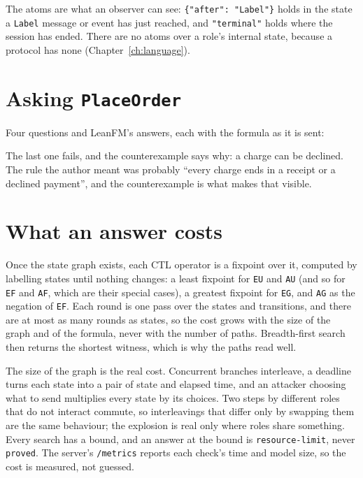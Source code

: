 The atoms are what an observer can see: \texttt{\{"after": "Label"\}} holds in
the state a \texttt{Label} message or event has just reached, and
\texttt{"terminal"} holds where the session has ended. There are no atoms over a
role's internal state, because a protocol has none (Chapter~\ref{ch:language}).

\section{Asking \texttt{PlaceOrder}}

Four questions and LeanFM's answers, each with the formula as it is sent:



The last one fails, and the counterexample says why: a charge can be declined.
The rule the author meant was probably ``every charge ends in a receipt or a
declined payment'', and the counterexample is what makes that visible.

\section{What an answer costs}

Once the state graph exists, each CTL operator is a fixpoint over it, computed by
labelling states until nothing changes: a least fixpoint for \texttt{EU} and
\texttt{AU} (and so for \texttt{EF} and \texttt{AF}, which are their special
cases), a greatest fixpoint for \texttt{EG}, and \texttt{AG} as the negation of
\texttt{EF}. Each round is one pass over the states and transitions, and there
are at most as many rounds as states, so the cost grows with the size of the
graph and of the formula, never with the number of paths. Breadth-first search
then returns the shortest witness, which is why the paths read well.

The size of the graph is the real cost. Concurrent branches interleave, a
deadline turns each state into a pair of state and elapsed time, and an attacker
choosing what to send multiplies every state by its choices. Two steps by
different roles that do not interact commute, so interleavings that differ only
by swapping them are the same behaviour; the explosion is real only where roles
share something. Every search has a bound, and an answer at the bound is
\texttt{resource-limit}, never \texttt{proved}. The server's \texttt{/metrics}
reports each check's time and model size, so the cost is measured, not guessed.

